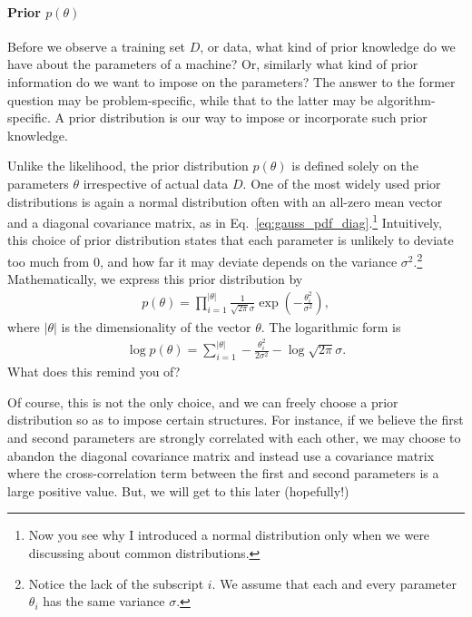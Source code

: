 \documentclass{report}
\begin{document}
\paragraph{Prior $p(\theta)$}

Before we observe a training set $D$, or data, what kind of prior knowledge do
we have about the parameters of a machine? Or, similarly what kind of prior
information do we want to impose on the parameters? The answer to the former
question may be problem-specific, while that to the latter may be
algorithm-specific. A prior distribution is our way to impose or incorporate
such prior knowledge. 

Unlike the likelihood, the prior distribution $p(\theta)$ is defined solely on
the parameters $\theta$ irrespective of actual data $D$. One of the most widely
used prior distributions is again a normal distribution often with an all-zero
mean vector and a diagonal covariance matrix, as in
Eq.~\eqref{eq:gauss_pdf_diag}.\footnote{
    Now you see why I introduced a normal distribution only when we were
    discussing about common distributions.
} Intuitively, this choice of prior distribution states that each parameter is
unlikely to deviate too much from $0$, and how far it may deviate depends on the
variance $\sigma^2$.\footnote{
    Notice the lack of the subscript $i$. We assume that each and every
    parameter $\theta_i$ has the same variance $\sigma$.
}
Mathematically, we express this prior distribution by
\begin{align*}
    p(\theta) = \prod_{i=1}^{|\theta|} \frac{1}{\sqrt{2\pi} \sigma} \exp \left(
    -\frac{\theta_i^2}{\sigma^2} \right),
\end{align*}
where $|\theta|$ is the dimensionality of the vector $\theta$. The logarithmic
form is 
\begin{align}
    \label{eq:logprior_gauss}
    \log p(\theta) = 
    \sum_{i=1}^{|\theta|} 
    -\frac{\theta_i^2}{2\sigma^2} - \log \sqrt{2\pi} \sigma.
\end{align}
What does this remind you of?

Of course, this is not the only choice, and we can freely
choose a prior distribution so as to impose certain structures. For instance, if
we believe the first and second parameters are strongly correlated with each
other, we may choose to abandon the diagonal covariance matrix and instead use a
covariance matrix where the cross-correlation term between the first and second
parameters is a large positive value. But, we will get to this later
(hopefully!)
\end{document}
